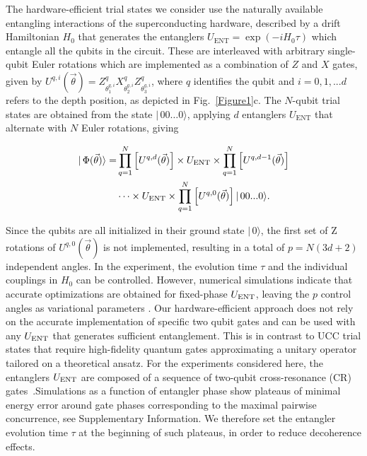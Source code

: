 \documentclass[twocolumn]{revtex4-1}
\newcommand{\1}{\mathbbm{1}}
\newcommand{\ket}[1]{ | \, #1 \rangle}
\begin{document}
The hardware-efficient trial states we consider use the naturally available entangling interactions of the superconducting hardware, described by a drift Hamiltonian $H_0$ that generates the entanglers $U_{\textrm{ENT}} = \exp(-i H_0 \tau)$ which entangle all the qubits in the circuit. These are interleaved with arbitrary single-qubit Euler rotations which are implemented  as a combination of  $Z$ and $X$ gates, given by $U^{q,i}(\vec\theta) = Z^q_{\theta^{q,i}_1}X^q_{\theta^{q,i}_2}Z^q_{\theta^{q,i}_3}$, where $q$ identifies the qubit and $i=0,1,...d$ refers to the depth position, as depicted in Fig.~\ref{Figure1}c. The $N$-qubit trial states are obtained from the state $\ket{00\ldots 0}$, applying $d$ entanglers $U_{\textrm{ENT}}$ that alternate with $N$ Euler rotations, giving

\begin{align}
\ket{\Phi(\vec{\theta})}=&\prod_{q=1}^N\left[ U^{q,d}(\vec{\theta})\right]\times U_{\textrm{\textrm{ENT}}}\times \prod_{q=1}^N\left[ U^{q,d-1}(\vec{\theta})\right]\nonumber\\
\label{VarState} & \cdots\times  U_{\textrm{\textrm{ENT}}}\times  \prod_{q=1}^N\left[ U^{q,0}(\vec{\theta})\right]\ket{00...0}.
\end{align}

Since the qubits are all initialized in their ground state $\ket{0}$, the first set of Z rotations of $U^{q,0}(\vec{\theta})$ is not implemented, resulting in a total of $p=N(3d+2)$ independent angles. In the experiment, the evolution time $\tau$ and the individual couplings in $H_0$ can be controlled. However, numerical simulations indicate that accurate optimizations are obtained for fixed-phase $U_{\textrm{\textrm{ENT}}}$, leaving the $p$ control angles as variational parameters . Our hardware-efficient approach does not rely on the accurate implementation of specific two qubit gates and can be used with any $U_\textrm{\textrm{ENT}}$ that generates sufficient entanglement. This is in contrast to UCC trial states that require high-fidelity quantum gates approximating a unitary operator tailored on a theoretical ansatz. For the experiments considered here, the entanglers $U_\textrm{\textrm{ENT}}$ are composed of a sequence of two-qubit cross-resonance (CR) gates~\cite{Sheldon2016}.Simulations as a function of entangler phase show plateaus of minimal energy error around gate phases corresponding to the maximal pairwise concurrence, see Supplementary Information. We therefore set  the entangler evolution time $\tau$ at the beginning of such plateaus, in order to reduce decoherence effects.
\end{document}
